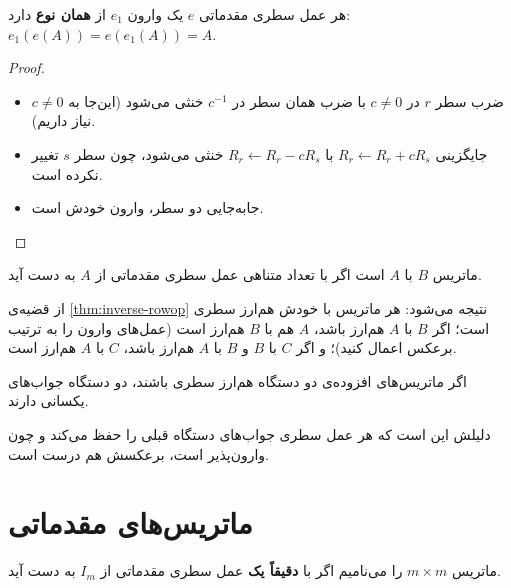 \begin{theorem}\label{thm:inverse-rowop}
هر عمل سطری مقدماتی $e$ یک وارون $e_1$ از \textbf{همان نوع} دارد: $e_1(e(A))=e(e_1(A))=A$.
\end{theorem}
\begin{proof}
\begin{itemize}
  \item ضرب سطر $r$ در $c\neq0$ با ضرب همان سطر در $c^{-1}$ خنثی می‌شود (این‌جا به $c\neq0$ نیاز داریم).
  \item جایگزینی $R_r\leftarrow R_r+cR_s$ با $R_r\leftarrow R_r-cR_s$ خنثی می‌شود، چون سطر $s$ تغییر نکرده است.
  \item جابه‌جایی دو سطر، وارون خودش است.
\end{itemize}
\end{proof}

\begin{definition}
ماتریس $B$ با $A$  است اگر با تعداد متناهی عمل سطری مقدماتی از $A$ به دست آید.
\end{definition}

\begin{note}
از قضیه‌ی \ref{thm:inverse-rowop} نتیجه می‌شود: هر ماتریس با خودش هم‌ارز سطری است؛ اگر $B$ با $A$ هم‌ارز باشد، $A$ هم با $B$ هم‌ارز است (عمل‌های وارون را به ترتیب برعکس اعمال کنید)؛ و اگر $C$ با $B$ و $B$ با $A$ هم‌ارز باشد، $C$ با $A$ هم‌ارز است.
\end{note}

\begin{theorem}\label{thm:row-equiv-solutions}
اگر ماتریس‌های افزوده‌ی دو دستگاه هم‌ارز سطری باشند، دو دستگاه جواب‌های یکسانی دارند.
\end{theorem}
دلیلش این است که هر عمل سطری جواب‌های دستگاه قبلی را حفظ می‌کند و چون وارون‌پذیر است، برعکسش هم درست است.

\section{ماتریس‌های مقدماتی}

\begin{definition}
ماتریس $m\times m$ را  می‌نامیم اگر با \textbf{دقیقاً یک} عمل سطری مقدماتی از $I_m$ به دست آید.
\end{definition}

